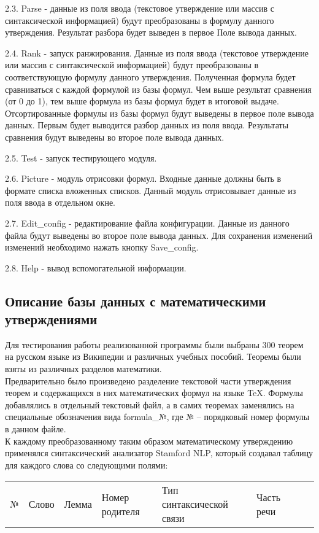 \documentclass[12pt]{article}
\begin{document}
2.3. Parse - данные из поля ввода (текстовое утверждение или массив с синтаксической информацией) будут преобразованы в формулу данного утверждения. Результат разбора будет выведен в первое Поле вывода данных.	

2.4. Rank - запуск ранжирования. Данные из поля ввода (текстовое утверждение или массив с синтаксической информацией) будут преобразованы  в соответствующую формулу данного утверждения.
 Полученная формула будет сравниваться с каждой формулой из базы формул. Чем выше результат сравнения (от 0 до 1), тем выше формула из базы формул будет в итоговой выдаче. Отсортированные формулы из базы формул будут выведены в первое поле вывода данных. Первым будет выводится разбор данных из поля ввода. Результаты сравнения будут выведены во второе поле вывода данных.
	   
2.5. Test - запуск тестирующего модуля. 

2.6. Picture - модуль отрисовки формул.   Входные данные должны быть в формате списка вложенных списков. Данный модуль отрисовывает данные из поля ввода в отдельном окне. 
	
2.7. Edit\_config - редактирование файла конфигурации. Данные из данного файла будут выведены во второе поле вывода данных. Для сохранения изменений изменений необходимо нажать кнопку Save\_config.
	
2.8. Help - вывод вспомогательной информации.
		  
\subsection{Описание базы данных с математическими утверждениями}
Для тестирования работы реализованной программы были выбраны 300 теорем на русском языке из Википедии и различных учебных пособий. Теоремы были взяты из различных разделов математики. \\

Предварительно было произведено разделение текстовой части утверждения теорем и содержащихся в них математических формул на языке TeX. Формулы добавлялись в отдельный текстовый файл, а в самих теоремах заменялись на специальные обозначения вида formula\_№, где № --  порядковый номер формулы в данном файле.\\

К каждому преобразованному таким образом математическому утверждению применялся синтаксический анализатор Stamford NLP, который создавал таблицу для каждого слова со следующими полями:

\begin{table}[h!]
\begin{tabular}{ l l l l l l l l }
№ & Слово & Лемма & Номер родителя & Тип синтаксической связи & Часть речи \\
\end{tabular}
\end{table} 
\end{document}
